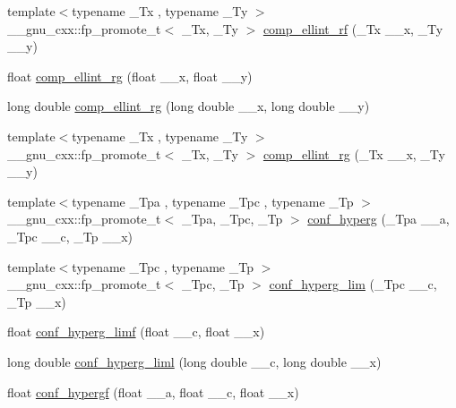 \begin{DoxyCompactItemize}
\item 
{\footnotesize template$<$typename \+\_\+\+Tx , typename \+\_\+\+Ty $>$ }\\\+\_\+\+\_\+gnu\+\_\+cxx\+::fp\+\_\+promote\+\_\+t$<$ \+\_\+\+Tx, \+\_\+\+Ty $>$ \hyperlink{group__gnu__math__spec__func_gaf6450c88127cf771acfc0667914266d1}{comp\+\_\+ellint\+\_\+rf} (\+\_\+\+Tx \+\_\+\+\_\+x, \+\_\+\+Ty \+\_\+\+\_\+y)
\item 
float \hyperlink{group__gnu__math__spec__func_ga978f8eec6e5edc918b243925dbacb65b}{comp\+\_\+ellint\+\_\+rg} (float \+\_\+\+\_\+x, float \+\_\+\+\_\+y)
\item 
long double \hyperlink{group__gnu__math__spec__func_gaca5fa8ee8125afc8f35ec6b27806e873}{comp\+\_\+ellint\+\_\+rg} (long double \+\_\+\+\_\+x, long double \+\_\+\+\_\+y)
\item 
{\footnotesize template$<$typename \+\_\+\+Tx , typename \+\_\+\+Ty $>$ }\\\+\_\+\+\_\+gnu\+\_\+cxx\+::fp\+\_\+promote\+\_\+t$<$ \+\_\+\+Tx, \+\_\+\+Ty $>$ \hyperlink{group__gnu__math__spec__func_ga389b1ef6cad1e33c1120665a4b915642}{comp\+\_\+ellint\+\_\+rg} (\+\_\+\+Tx \+\_\+\+\_\+x, \+\_\+\+Ty \+\_\+\+\_\+y)
\item 
{\footnotesize template$<$typename \+\_\+\+Tpa , typename \+\_\+\+Tpc , typename \+\_\+\+Tp $>$ }\\\+\_\+\+\_\+gnu\+\_\+cxx\+::fp\+\_\+promote\+\_\+t$<$ \+\_\+\+Tpa, \+\_\+\+Tpc, \+\_\+\+Tp $>$ \hyperlink{group__gnu__math__spec__func_ga4d01e85e7d295afca5d9f8b6c68f19cc}{conf\+\_\+hyperg} (\+\_\+\+Tpa \+\_\+\+\_\+a, \+\_\+\+Tpc \+\_\+\+\_\+c, \+\_\+\+Tp \+\_\+\+\_\+x)
\item 
{\footnotesize template$<$typename \+\_\+\+Tpc , typename \+\_\+\+Tp $>$ }\\\+\_\+\+\_\+gnu\+\_\+cxx\+::fp\+\_\+promote\+\_\+t$<$ \+\_\+\+Tpc, \+\_\+\+Tp $>$ \hyperlink{group__gnu__math__spec__func_ga9fe7a5e2e741f56d88fd29bc249feab2}{conf\+\_\+hyperg\+\_\+lim} (\+\_\+\+Tpc \+\_\+\+\_\+c, \+\_\+\+Tp \+\_\+\+\_\+x)
\item 
float \hyperlink{group__gnu__math__spec__func_ga609879a370bc4e9fc70563806bc49cb9}{conf\+\_\+hyperg\+\_\+limf} (float \+\_\+\+\_\+c, float \+\_\+\+\_\+x)
\item 
long double \hyperlink{group__gnu__math__spec__func_ga367be9b77eb1f9ccc2971d5300da48d1}{conf\+\_\+hyperg\+\_\+liml} (long double \+\_\+\+\_\+c, long double \+\_\+\+\_\+x)
\item 
float \hyperlink{group__gnu__math__spec__func_gabd18e600aa78c3f2b2f835039506c810}{conf\+\_\+hypergf} (float \+\_\+\+\_\+a, float \+\_\+\+\_\+c, float \+\_\+\+\_\+x)

\end{DoxyCompactItemize}
